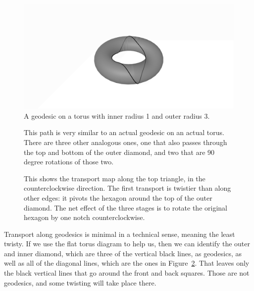 \begin{figure}[h]
\centering
\includegraphics[scale=.3]{torus_geodesic.png}
\caption{A geodesic on a torus with inner radius 1 and outer radius 3.}
\label{fig:torus_geodesic_smooth}
\end{figure}

\begin{figure}[h]
\centering

\caption{This path is very similar to an actual geodesic on an actual torus. There are three other analogous ones, one that also passes through the top and bottom of the outer diamond, and two that are 90 degree rotations of those two.}
\label{fig:torus_geodesic}
\end{figure}

\begin{figure}[h]
\centering




\caption{This shows the transport map along the top triangle, in the counterclockwise direction. The first transport is twistier than along other edges: it pivots the hexagon around the top of the outer diamond. The net effect of the three stages is to rotate the original hexagon by one notch counterclockwise.}
\label{fig:torus_twist}
\end{figure}

Transport along geodesics is minimal in a technical sense, meaning the least twisty. If we use the flat torus diagram to help us, then we can identify the outer and inner diamond, which are three of the vertical black lines, as geodesics, as well as all of the diagonal lines, which are the ones in Figure~\ref{fig:torus_geodesic}. That leaves only the black vertical lines that go around the front and back squares. Those are not geodesics, and some twisting will take place there.

